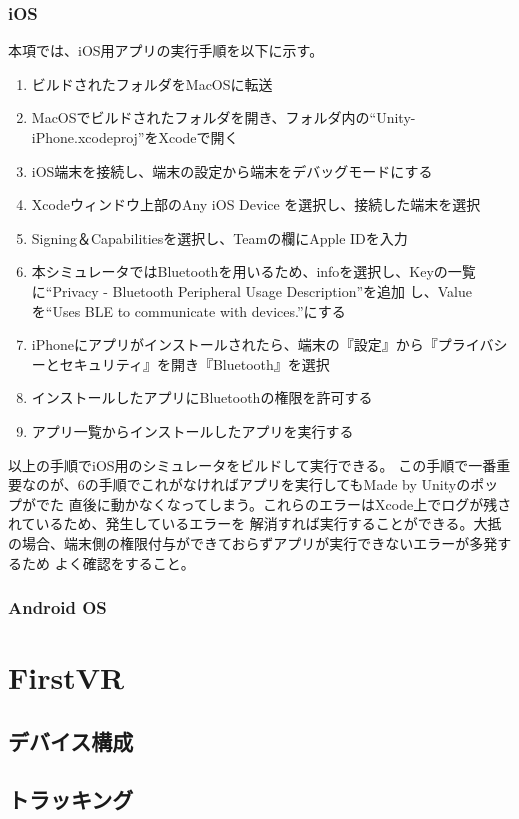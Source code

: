 \documentclass{ltjsreport}
\begin{document}
			\subsubsection{iOS}
				本項では、iOS用アプリの実行手順を以下に示す。
				\begin{enumerate}
					\item ビルドされたフォルダをMacOSに転送
					\item MacOSでビルドされたフォルダを開き、フォルダ内の``Unity-iPhone.xcodeproj''をXcodeで開く
					\item iOS端末を接続し、端末の設定から端末をデバッグモードにする
					\item Xcodeウィンドウ上部のAny iOS Device を選択し、接続した端末を選択
					\item Signing＆Capabilitiesを選択し、Teamの欄にApple IDを入力
					\item 本シミュレータではBluetoothを用いるため、infoを選択し、Keyの一覧に``Privacy - Bluetooth Peripheral Usage Description''を追加
						し、Valueを``Uses BLE to communicate with devices.''にする
					\item iPhoneにアプリがインストールされたら、端末の『設定』から『プライバシーとセキュリティ』を開き『Bluetooth』を選択
					\item インストールしたアプリにBluetoothの権限を許可する
					\item アプリ一覧からインストールしたアプリを実行する
				\end{enumerate}
				以上の手順でiOS用のシミュレータをビルドして実行できる。
				この手順で一番重要なのが、6の手順でこれがなければアプリを実行してもMade by Unityのポップがでた
				直後に動かなくなってしまう。これらのエラーはXcode上でログが残されているため、発生しているエラーを
				解消すれば実行することができる。大抵の場合、端末側の権限付与ができておらずアプリが実行できないエラーが多発するため
				よく確認をすること。
			\subsubsection{Android OS}
	\section{FirstVR}
		\subsection{デバイス構成}
		\subsection{トラッキング}
\end{document}
